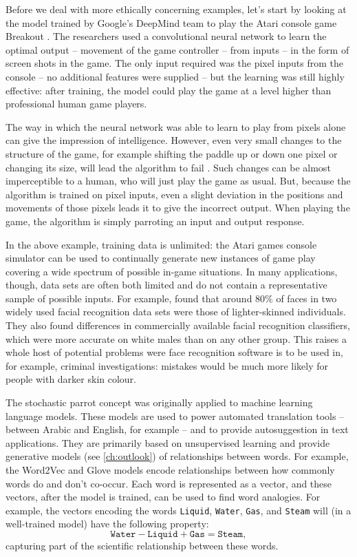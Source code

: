Before we deal with more ethically concerning examples, let's start by looking at the model trained by Google's DeepMind team to play the Atari console game Breakout \parencite{mnih2015human}. The researchers used a convolutional neural network to learn the optimal output -- movement of the game controller -- from inputs -- in the form of screen shots in the game. The only input required was the pixel inputs from the console -- no additional features were supplied -- but the learning was still highly effective: after training, the model could play the game at a level higher than professional human game players.

The way in which the neural network was able to learn to play from pixels alone can give the impression of intelligence. However, even very small changes to the structure of the game, for example shifting the paddle up or down one pixel or changing its size, will lead the algorithm to fail \parencite{kansky2017schema}. Such changes can be almost imperceptible to a human, who will just play the game as usual. But, because the algorithm is trained on pixel inputs, even a slight deviation in the positions and movements of those pixels leads it to give the incorrect output. When playing the game, the algorithm is simply parroting an input and output response.

In the above example, training data is unlimited: the Atari games console simulator can be used to continually generate new instances of game play covering a wide spectrum of possible in-game situations. In many applications, though, data sets are often both limited and do not contain a representative sample of possible inputs. For example, \textcite{buolamwini2018gender} found that around 80\% of faces in two widely used facial recognition data sets were those of lighter-skinned individuals. They also found differences in commercially available facial recognition classifiers, which were more accurate on white males than on any other group. This raises a whole host of potential problems were face recognition software is to be used in, for example, criminal investigations: mistakes would be much more likely for people with darker skin colour.

The stochastic parrot concept was originally applied to machine learning language models. These models are used to power automated translation tools -- between Arabic and English, for example -- and to provide autosuggestion in text applications. They are primarily based on unsupervised learning and provide generative models (see \cref{ch:outlook}) of relationships between words. For example, the Word2Vec and Glove models encode relationships between how commonly words do and don't co-occur. Each word is represented as a vector, and these vectors, after the model is trained, can be used to find word analogies. For example,  the vectors encoding the words \texttt{Liquid}, \texttt{Water}, \texttt{Gas}, and \texttt{Steam} will (in a well-trained model) have the following property:
\[
\texttt{Water} - \texttt{Liquid} + \texttt{Gas} = \texttt{Steam},
\]
capturing part of the scientific relationship between these words.

